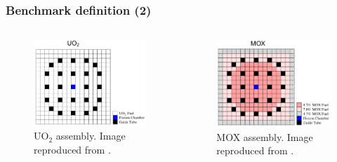 \begin{frame}
\frametitle{Benchmark definition (2)}

\begin{columns}
    \column[t]{5.5cm}
    \begin{figure}[htbp!]
        \begin{center}
            \includegraphics[width=5.5cm]{../C5G2-benchmark/bench-config2}
        \end{center}
        \caption{UO$_2$ assembly. Image reproduced from \cite{capilla_applications_2009}.}
    \end{figure}

    \column[t]{5.5cm}
    \begin{figure}[htbp!]
        \begin{center}
            \includegraphics[width=5.5cm]{../C5G2-benchmark/bench-config3}
        \end{center}
        \caption{MOX assembly. Image reproduced from \cite{capilla_applications_2009}.}
    \end{figure}
\end{columns}
\end{frame}